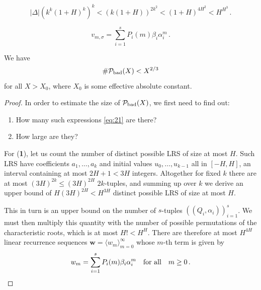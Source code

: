 \documentclass[10pt,a4paper]{amsart}
\begin{document}
\begin{equation}
\label{eq:house}
  |\Delta| (k^k(1+H)^k)^k < (k(1+H))^{2k^2} < (1+H)^{4H^2}< H^{H^3}
  \, .
\end{equation}  

\begin{equation}
\label{eq:21}
v_{m,\sigma}=\sum_{i=1}^s P_i(m)\beta_i \alpha_i^{m} \, .
\end{equation}

\begin{proposition}
\label{prop:density}  
We have 
\[
\# {\mathcal P}_{\text{\rm bad}}(X)<X^{2/3}
\]
for all $X>X_0$, where $X_0$ is some effective absolute constant. 
\end{proposition}

\begin{proof}
In order to estimate the size of ${\mathcal P}_{\text{\rm bad}}(X)$,
we first need to find out: 
\begin{enumerate}
\item[\textbf{1}.] How many such expressions \eqref{eq:21} are there?
\item[\textbf{2}.] How large are they?
\end{enumerate}

For (\textbf{1}), let us count the number of distinct possible LRS of
size at most $H$. Such LRS have coefficients $a_1,\ldots,a_k$ and initial values
$u_0,\ldots,u_{k-1}$ all in $[-H,H]$, an interval containing at
most $2H+1<3H$ integers. Altogether for fixed $k$ there are at most
$(3H)^{2k}\le (3H)^{2H}$ $2k$-tuples, and summing up over $k$ we
derive an upper bound of $H(3H)^{2H}<H^{3H}$ distinct
possible LRS of size at most $H$.

This in turn is an upper bound on
the number of $s$-tuples $((Q_i ,\alpha_i))_{i=1}^s$. We must then
multiply this quantity with the number of possible permutations of the
characteristic roots,
which is at most $H!<H^H$. There are therefore
at most $H^{4H}$ linear recurrence sequences
$\mathbf{w} = \langle w_m \rangle_{m=0}^{\infty}$ whose $m$-th term is
given by
\[
w_m=\sum_{i=1}^s P_i(m)\beta_i\alpha_i^m\quad {\text{\rm
    for~all}}\quad m\ge 0 \, .
\]


\end{proof}
\end{document}
